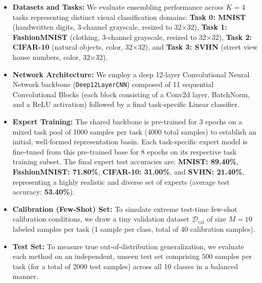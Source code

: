 \begin{itemize}
    \item \textbf{Datasets and Tasks:} We evaluate ensembling performance across $K = 4$ tasks representing distinct visual classification domains: \textbf{Task 0: MNIST} (handwritten digits, 3-channel grayscale, resized to 32$\times$32), \textbf{Task 1: FashionMNIST} (clothing, 3-channel grayscale, resized to 32$\times$32), \textbf{Task 2: CIFAR-10} (natural objects, color, 32$\times$32), and \textbf{Task 3: SVHN} (street view house numbers, color, 32$\times$32).
    \item \textbf{Network Architecture:} We employ a deep 12-layer Convolutional Neural Network backbone (\texttt{Deep12LayerCNN}) composed of 11 sequential Convolutional Blocks (each block consisting of a Conv2d layer, BatchNorm, and a ReLU activation) followed by a final task-specific Linear classifier.
    \item \textbf{Expert Training:} The shared backbone is pre-trained for 3 epochs on a mixed task pool of 1000 samples per task (4000 total samples) to establish an initial, well-formed representation basin. Each task-specific expert model is fine-tuned from this pre-trained base for 8 epochs on its respective task training subset. The final expert test accuracies are: \textbf{MNIST: 89.40\%}, \textbf{FashionMNIST: 71.80\%}, \textbf{CIFAR-10: 31.00\%}, and \textbf{SVHN: 21.40\%}, representing a highly realistic and diverse set of experts (average test accuracy: \textbf{53.40\%}).
    \item \textbf{Calibration (Few-Shot) Set:} To simulate extreme test-time few-shot calibration conditions, we draw a tiny validation dataset $\mathcal{D}_{\text{cal}}$ of size $M = 10$ labeled samples per task (1 sample per class, total of 40 calibration samples).
    \item \textbf{Test Set:} To measure true out-of-distribution generalization, we evaluate each method on an independent, unseen test set comprising $500$ samples per task (for a total of 2000 test samples) across all 10 classes in a balanced manner.

\end{itemize}
